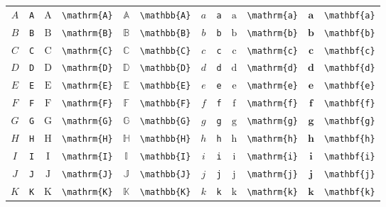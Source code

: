 \documentclass{ctexbook}
\begin{document}
\begin{table}[th]
	\centering
	\renewcommand\arraystretch{0.99}
	\begin{tabular}{ c@{ }l c@{ }l c@{ }l c@{ }l c@{ }l c@{ }l}
		\hline
		$A$ & \verb|A| & $\mathrm{A}$ & \verb|\mathrm{A}| & $\mathbb{A}$ & \verb|\mathbb{A}| & $a$ & \verb|a| & $\mathrm{a}$ & \verb|\mathrm{a}| & $\mathbf{a}$ & \verb|\mathbf{a}| \\
		$B$ & \verb|B| & $\mathrm{B}$ & \verb|\mathrm{B}| & $\mathbb{B}$ & \verb|\mathbb{B}| & $b$ & \verb|b| & $\mathrm{b}$ & \verb|\mathrm{b}| & $\mathbf{b}$ & \verb|\mathbf{b}| \\
		$C$ & \verb|C| & $\mathrm{C}$ & \verb|\mathrm{C}| & $\mathbb{C}$ & \verb|\mathbb{C}| & $c$ & \verb|c| & $\mathrm{c}$ & \verb|\mathrm{c}| & $\mathbf{c}$ & \verb|\mathbf{c}| \\
		$D$ & \verb|D| & $\mathrm{D}$ & \verb|\mathrm{D}| & $\mathbb{D}$ & \verb|\mathbb{D}| & $d$ & \verb|d| & $\mathrm{d}$ & \verb|\mathrm{d}| & $\mathbf{d}$ & \verb|\mathbf{d}| \\
		$E$ & \verb|E| & $\mathrm{E}$ & \verb|\mathrm{E}| & $\mathbb{E}$ & \verb|\mathbb{E}| & $e$ & \verb|e| & $\mathrm{e}$ & \verb|\mathrm{e}| & $\mathbf{e}$ & \verb|\mathbf{e}| \\
		$F$ & \verb|F| & $\mathrm{F}$ & \verb|\mathrm{F}| & $\mathbb{F}$ & \verb|\mathbb{F}| & $f$ & \verb|f| & $\mathrm{f}$ & \verb|\mathrm{f}| & $\mathbf{f}$ & \verb|\mathbf{f}| \\
		$G$ & \verb|G| & $\mathrm{G}$ & \verb|\mathrm{G}| & $\mathbb{G}$ & \verb|\mathbb{G}| & $g$ & \verb|g| & $\mathrm{g}$ & \verb|\mathrm{g}| & $\mathbf{g}$ & \verb|\mathbf{g}| \\
		$H$ & \verb|H| & $\mathrm{H}$ & \verb|\mathrm{H}| & $\mathbb{H}$ & \verb|\mathbb{H}| & $h$ & \verb|h| & $\mathrm{h}$ & \verb|\mathrm{h}| & $\mathbf{h}$ & \verb|\mathbf{h}| \\
		$I$ & \verb|I| & $\mathrm{I}$ & \verb|\mathrm{I}| & $\mathbb{I}$ & \verb|\mathbb{I}| & $i$ & \verb|i| & $\mathrm{i}$ & \verb|\mathrm{i}| & $\mathbf{i}$ & \verb|\mathbf{i}| \\
		$J$ & \verb|J| & $\mathrm{J}$ & \verb|\mathrm{J}| & $\mathbb{J}$ & \verb|\mathbb{J}| & $j$ & \verb|j| & $\mathrm{j}$ & \verb|\mathrm{j}| & $\mathbf{j}$ & \verb|\mathbf{j}| \\
		$K$ & \verb|K| & $\mathrm{K}$ & \verb|\mathrm{K}| & $\mathbb{K}$ & \verb|\mathbb{K}| & $k$ & \verb|k| & $\mathrm{k}$ & \verb|\mathrm{k}| & $\mathbf{k}$ & \verb|\mathbf{k}| \\

\end{tabular}
\end{table}
\end{document}
